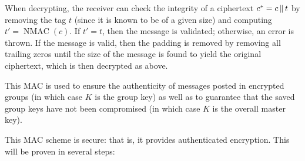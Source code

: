 \documentclass{amsart}
\begin{document}
When decrypting, the receiver can check the integrity of a ciphertext $c^* = c\operatorname{\|} t$ by removing the tag $t$ (since it is known to be of a given size) and computing $t' = \operatorname{NMAC}(c)$. If $t' = t$, then the message is validated; otherwise, an error is thrown. If the message is valid, then the padding is removed by removing all trailing zeros until the size of the message is found to yield the original ciphertext, which is then decrypted as above.

This MAC is used to ensure the authenticity of messages posted in encrypted groups (in which case $K$ is the group key) as well as to guarantee that the saved group keys have not been compromised (in which case $K$ is the overall master key).

This MAC scheme is secure: that is, it provides authenticated encryption. This will be proven in several steps:
\end{document}
